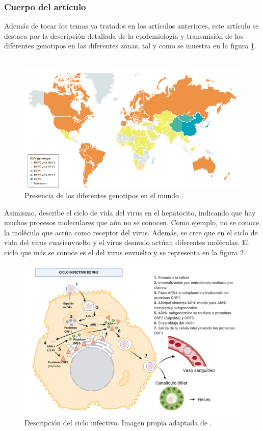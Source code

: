 \documentclass[11 pt]{article}
\begin{document}
\subsubsection{Cuerpo del artículo}
Además de tocar los temas ya tratados en los artículos anteriores, este artículo se destaca por la descripción detallada de la epidemiología y transmisión de los diferentes genotipos en las diferentes zonas, tal y como se muestra en la figura \ref{kamarmapa}.\\\\
\begin{figure} [h!] 
	\centering
	\includegraphics[width=0.80\linewidth]{imagenes/mapaepidemiologia.png}
	\caption[loftitle]{Presencia de los diferentes genotipos en el mundo \cite{Kamar2017}.}
	\label{kamarmapa}
\end{figure}
Asimismo, describe el ciclo de vida del virus en el hepatocito, indicando que hay muchos procesos moleculares que aún no se conocen. Como ejemplo, no se conoce la molécula que actúa como receptor del virus. Además, se cree que en el ciclo de vida del virus cuasienvuelto y el virus desnudo actúan diferentes moléculas. El ciclo que más se conoce es el del virus envuelto y se representa en la figura \ref{kamarciclo}.
\begin{figure} [h!] 
	\centering
	\includegraphics[width=0.80\linewidth]{imagenes/cicloinfectivo.png}
	\caption[loftitle]{Descripción del ciclo infectivo. Imagen propia adaptada de  \cite{Kamar2017}.}
	\label{kamarciclo}
\end{figure}
\end{document}
